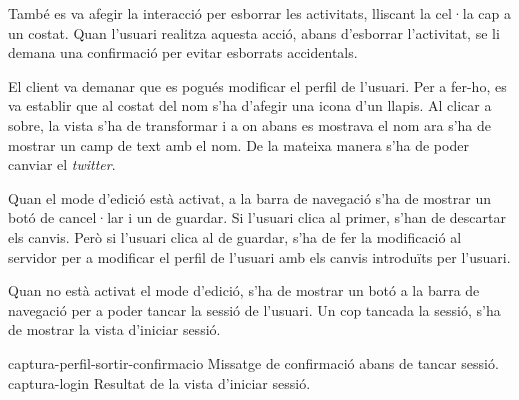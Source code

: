 També es va afegir la interacció per esborrar les activitats, lliscant la cel·la cap a un costat. Quan l'usuari realitza aquesta acció, abans d'esborrar l'activitat, se li demana una confirmació per evitar esborrats accidentals.

El client va demanar que es pogués modificar el perfil de l'usuari. Per a fer-ho, es va establir que al costat del nom s'ha d'afegir una icona d'un llapis. Al clicar a sobre, la vista s'ha de transformar i a on abans es mostrava el nom ara s'ha de mostrar un camp de text amb el nom. De la mateixa manera s'ha de poder canviar el \textit{twitter}.


Quan el mode d'edició està activat, a la barra de navegació s'ha de mostrar un botó de cancel·lar i un de guardar. Si l'usuari clica al primer, s'han de descartar els canvis. Però si l'usuari clica al de guardar, s'ha de fer la modificació al servidor per a modificar el perfil de l'usuari amb els canvis introduïts per l'usuari. 

Quan no està activat el mode d'edició, s'ha de mostrar un botó a la barra de navegació per a poder tancar la sessió de l'usuari. Un cop tancada la sessió, s'ha de mostrar la vista d'iniciar sessió.

\pintaDosImatges
    {captura-perfil-sortir-confirmacio}
        {Missatge de confirmació abans de tancar sessió.}
    {captura-login}
        {Resultat de la vista d'iniciar sessió.}

\clearpage
